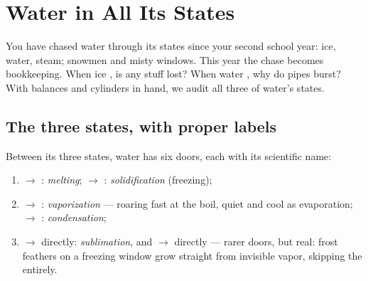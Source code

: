 \chapter{Water in All Its States}\label{ch:g6:water-states}

You have chased water through its states since your second school
year: ice, water, steam;  snowmen and misty windows. This
year the chase becomes bookkeeping. When ice , is any stuff
lost? When water , why do pipes burst? With balances and
cylinders in hand, we audit all three of water's states.

\section{The three states, with proper labels}

\begin{definition}\label{def:g6:water-states:changes}
Between its three states, water has six doors, each with its
scientific name:
\begin{enumerate}
  \item {} $\to$ : \emph{melting};
         $\to$ :
        \emph{solidification} (freezing);
  \item {} $\to$ : \emph{vaporization}
        --- roaring fast at the boil, quiet and cool as
        evaporation;  $\to$ :
        \emph{condensation};
  \item {} $\to$  directly:
        \emph{sublimation}, and  $\to$ 
        directly --- rarer doors, but real: frost feathers on a
        freezing window grow straight from invisible vapor,
        skipping the  entirely.
\end{enumerate}
\end{definition}

